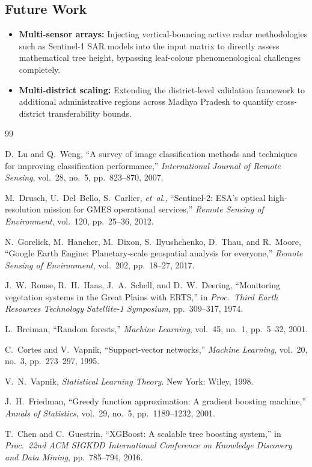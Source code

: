 \documentclass[12pt, a4paper, twocolumn]{article}
\begin{document}
\subsection{Future Work}

\begin{itemize}
    \item \textbf{Multi-sensor arrays:} Injecting vertical-bouncing active radar methodologies such as Sentinel-1 SAR models into the input matrix to directly assess mathematical tree height, bypassing leaf-colour phenomenological challenges completely.
    \item \textbf{Multi-district scaling:} Extending the district-level validation framework to additional administrative regions across Madhya Pradesh to quantify cross-district transferability bounds.
\end{itemize}

\begin{thebibliography}{99}

D.~Lu and Q.~Weng, ``A survey of image classification methods and techniques for improving classification performance,'' \textit{International Journal of Remote Sensing}, vol.~28, no.~5, pp.~823--870, 2007.

M.~Drusch, U.~Del~Bello, S.~Carlier, \textit{et~al.}, ``Sentinel-2: ESA's optical high-resolution mission for GMES operational services,'' \textit{Remote Sensing of Environment}, vol.~120, pp.~25--36, 2012.

N.~Gorelick, M.~Hancher, M.~Dixon, S.~Ilyushchenko, D.~Thau, and R.~Moore, ``Google Earth Engine: Planetary-scale geospatial analysis for everyone,'' \textit{Remote Sensing of Environment}, vol.~202, pp.~18--27, 2017.

J.~W.~Rouse, R.~H.~Haas, J.~A.~Schell, and D.~W.~Deering, ``Monitoring vegetation systems in the Great Plains with ERTS,'' in \textit{Proc.\ Third Earth Resources Technology Satellite-1 Symposium}, pp.~309--317, 1974.

L.~Breiman, ``Random forests,'' \textit{Machine Learning}, vol.~45, no.~1, pp.~5--32, 2001.

C.~Cortes and V.~Vapnik, ``Support-vector networks,'' \textit{Machine Learning}, vol.~20, no.~3, pp.~273--297, 1995.

V.~N.~Vapnik, \textit{Statistical Learning Theory}. New York: Wiley, 1998.

J.~H.~Friedman, ``Greedy function approximation: A gradient boosting machine,'' \textit{Annals of Statistics}, vol.~29, no.~5, pp.~1189--1232, 2001.

T.~Chen and C.~Guestrin, ``XGBoost: A scalable tree boosting system,'' in \textit{Proc.\ 22nd ACM SIGKDD International Conference on Knowledge Discovery and Data Mining}, pp.~785--794, 2016.

\end{thebibliography}
\end{document}
